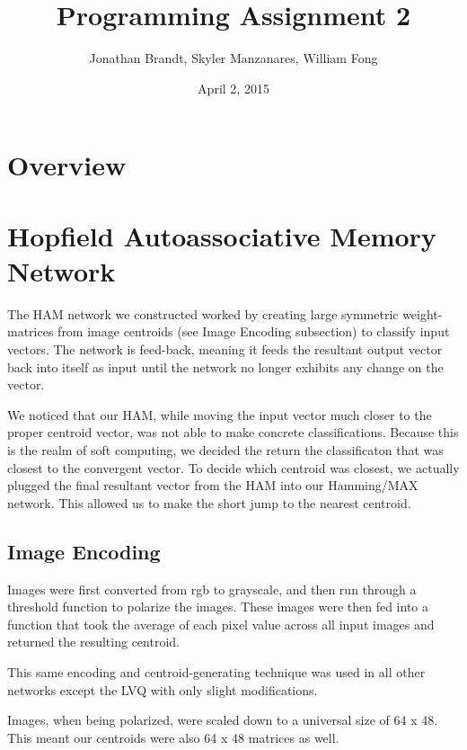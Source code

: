 \documentclass{article}
\begin{document}
\author{Jonathan Brandt, Skyler Manzanares, William Fong}
\date{April 2, 2015}
\title{Programming Assignment 2}

\maketitle

\section{Overview}

\section{Hopfield Autoassociative Memory Network}
The HAM network we constructed worked by creating large symmetric weight-matrices from image centroids (see Image Encoding subsection) to classify input vectors. The network is feed-back, meaning it feeds the resultant output vector back into itself as input until the network no longer exhibits any change on the vector. 

We noticed that our HAM, while moving the input vector much closer to the proper centroid vector, was not able to make concrete classifications. Because this is the realm of soft computing, we decided the return the classificaton that was closest to the convergent vector. To decide which centroid was closest, we actually plugged the final resultant vector from the HAM into our Hamming/MAX network. This allowed us to make the short jump to the nearest centroid.

\subsection{Image Encoding}
Images were first converted from rgb to grayscale, and then run through a threshold function to polarize the images. These images were then fed into a function that took the average of each pixel value across all input images and returned the resulting centroid.

This same encoding and centroid-generating technique was used in all other networks except the LVQ with only slight modifications.

Images, when being polarized, were scaled down to a universal size of 64 x 48. This meant our centroids were also 64 x 48 matrices as well.
\end{document}
